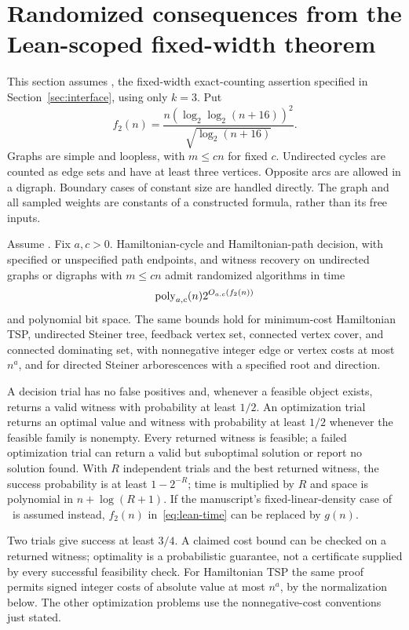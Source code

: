 \section{Randomized consequences from the Lean-scoped fixed-width theorem}
\label{sec:lean-connectivity}

This section assumes \HLean, the fixed-width exact-counting assertion
specified in Section~\ref{sec:interface}, using only $k=3$.
Put
\[
 f_2(n)=\frac{n(\log_2\log_2(n+16))^2}{\sqrt{\log_2(n+16)}}.
\]
Graphs are simple and loopless, with $m\le cn$ for fixed $c$.
Undirected cycles are counted as edge sets and have at least three
vertices. Opposite arcs are allowed in a digraph. Boundary cases of
constant size are handled directly. The graph and all sampled weights
are constants of a constructed formula, rather than its free inputs.

\begin{theorem}
\label{thm:lean-randomized}
Assume \HLean. Fix $a,c>0$. Hamiltonian-cycle and Hamiltonian-path
decision, with specified or unspecified path endpoints, and witness
recovery on undirected graphs or digraphs with $m\le cn$ admit
randomized algorithms in time
\begin{equation}\label{eq:lean-time}
 \operatorname{poly}_{a,c}(n)2^{O_{a,c}(f_2(n))}
\end{equation}
and polynomial bit space. The same bounds hold for minimum-cost
Hamiltonian TSP, undirected Steiner tree, feedback vertex set,
connected vertex cover, and connected dominating set, with
nonnegative integer edge or vertex costs at most $n^a$, and for
directed Steiner arborescences with a specified root and direction.

A decision trial has no false positives and, whenever a feasible
object exists, returns a valid witness with probability at least $1/2$.
An optimization trial returns an optimal value and witness with
probability at least $1/2$ whenever the feasible family is nonempty.
Every returned witness is feasible; a failed optimization trial can
return a valid but suboptimal solution or report no solution found.
With $R$ independent trials and the best returned witness, the success
probability is at least $1-2^{-R}$; time is multiplied by $R$ and space
is polynomial in $n+\log(R+1)$. If the manuscript's fixed-linear-density
case of \HBB\ is assumed instead, $f_2(n)$ in~\eqref{eq:lean-time}
can be replaced by $g(n)$.
\end{theorem}

Two trials give success at least $3/4$. A claimed cost bound can be
checked on a returned witness; optimality is a probabilistic guarantee,
not a certificate supplied by every successful feasibility check.
For Hamiltonian TSP the same proof permits signed integer costs of
absolute value at most $n^a$, by the normalization below. The other
optimization problems use the nonnegative-cost conventions just stated.

